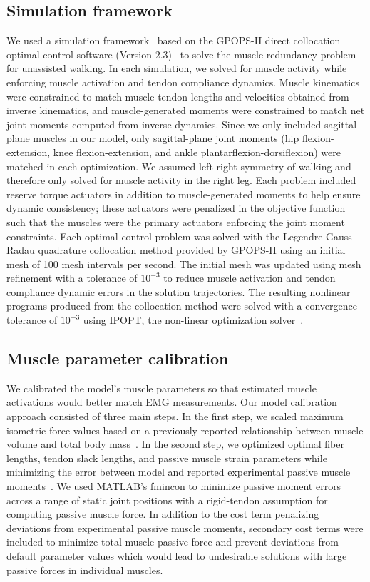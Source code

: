 \documentclass[10pt,letterpaper]{article}
\begin{document}
\subsection*{Simulation framework}
We used a simulation framework~\cite{DeGroote:2016} based on the GPOPS-II direct collocation optimal control software (Version 2.3)~\cite{Patterson:2014} to solve the muscle redundancy problem for unassisted walking. In each simulation, we solved for muscle activity while enforcing muscle activation and tendon compliance dynamics. Muscle kinematics were constrained to match muscle-tendon lengths and velocities obtained from inverse kinematics, and muscle-generated moments were constrained to match net joint moments computed from inverse dynamics. Since we only included sagittal-plane muscles in our model, only sagittal-plane joint moments (hip flexion-extension, knee flexion-extension, and ankle plantarflexion-dorsiflexion) were matched in each optimization. We assumed left-right symmetry of walking and therefore only solved for muscle activity in the right leg. Each problem included reserve torque actuators in addition to muscle-generated moments to help ensure dynamic consistency; these actuators were penalized in the objective function such that the muscles were the primary actuators enforcing the joint moment constraints. Each optimal control problem was solved with the Legendre-Gauss-Radau quadrature collocation method provided by GPOPS-II using an initial mesh of 100 mesh intervals per second. The initial mesh was updated using mesh refinement with a tolerance of $10^{-3}$ to reduce muscle activation and tendon compliance dynamic errors in the solution trajectories. The resulting nonlinear programs produced from the collocation method were solved with a convergence tolerance of $10^{-3}$ using IPOPT, the non-linear optimization solver~\cite{Wachter:2006}.

\subsection*{Muscle parameter calibration}
We calibrated the model’s muscle parameters so that estimated muscle activations would better match EMG measurements. Our model calibration approach consisted of three main steps. In the first step, we scaled maximum isometric force values based on a previously reported relationship between muscle volume and total body mass~\cite{Handsfield:2014}. In the second step, we optimized optimal fiber lengths, tendon slack lengths, and passive muscle strain parameters while minimizing the error between model and reported experimental passive muscle moments~\cite{Silder:2007}. We used MATLAB’s fmincon to minimize passive moment errors across a range of static joint positions with a rigid-tendon assumption for computing passive muscle force. In addition to the cost term penalizing deviations from experimental passive muscle moments, secondary cost terms were included to minimize total muscle passive force and prevent deviations from default parameter values which would lead to undesirable solutions with large passive forces in individual muscles.
\end{document}

